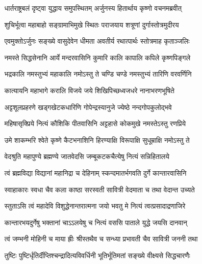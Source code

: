 


\twolineshloka
{धार्तराष्ट्रबलं दृष्ट्वा युद्धाय समुपस्थितम्}
{अर्जुनस्य हितार्थाय कृष्णो वचनमब्रवीत्}


\twolineshloka
{शुचिर्भूत्वा महाबाहो सङ्ग्रामाभिमुखे स्थितः}
{पराजयाय शत्रूणां दुर्गास्तोत्रमुदीरय}


\twolineshloka
{एवमुक्तोऽर्जुनः सङ्ख्ये वासुदेवेन धीमता}
{अवतीर्य रथात्पार्थः स्तोत्रमाह कृताञ्जलिः}


\twolineshloka
{नमस्ते सिद्धसेनानि आर्ये मन्दरवासिनि}
{कुमारि कालि कापालि कपिले कृष्णपिङ्गले}

\twolineshloka
{भद्रकालि नमस्तुभ्यं महाकालि नमोऽस्तु ते}
{चण्डि चण्डे नमस्तुभ्यं तारिणि वरवर्णिनि}

\twolineshloka
{कात्यायनि महाभागे करालि विजये जये}
{शिखिपिच्छध्वजधरे नानाभरणभूषिते}

\twolineshloka
{अट्टशूलप्रहरणे खड्गखेटकधारिणि}
{गोपेन्द्रस्यानुजे ज्येष्ठे नन्दगोपकुलोद्भवे}

\twolineshloka
{महिषासृक्प्रिये नित्यं कौशिकि पीतवासिनि}
{अट्टहासे कोकमुखे नमस्तेऽस्तु रणप्रिये}

\twolineshloka
{उमे शाकम्भरि श्वेते कृष्णे कैटभनाशिनि}
{हिरण्याक्षि विरूपाक्षि सुधूम्राक्षि नमोऽस्तु ते}

\twolineshloka
{वेदश्रुति महापुण्ये ब्रह्मण्ये जातवेदसि}
{जम्बूकटकचैत्येषु नित्यं सन्निहितालये}

\twolineshloka
{त्वं ब्रह्मविद्या विद्यानां महानिद्रा च देहिनाम्}
{स्कन्दमातर्भगवति दुर्गे कान्तारवासिनि}

\twolineshloka
{स्वाहाकारः स्वधा चैव कला काष्ठा सरस्वती}
{सावित्री वेदमाता च तथा वेदान्त उच्यते}

\twolineshloka
{स्तुताऽसि त्वं महादेवि विशुद्धेनान्तरात्मना}
{जयो भवतु मे नित्यं त्वत्प्रसादाद्रणाजिरे}

\twolineshloka
{कान्तारभयदुर्गेषु भक्तानां चाऽऽलयेषु च}
{नित्यं वससि पाताले युद्धे जयसि दानवान्}

\twolineshloka
{त्वं जम्भनी मोहिनी च माया ह्रीः श्रीस्तथैव च}
{सन्ध्या प्रभावती चैव सावित्री जननी तथा}

\twolineshloka
{तुष्टिः पुष्टिर्धृतिर्दीप्तिश्चन्द्रादित्यविवर्धिनी}
{भूतिर्भूतिमतां सङ्ख्ये वीक्ष्यसे सिद्धचारणैः}

